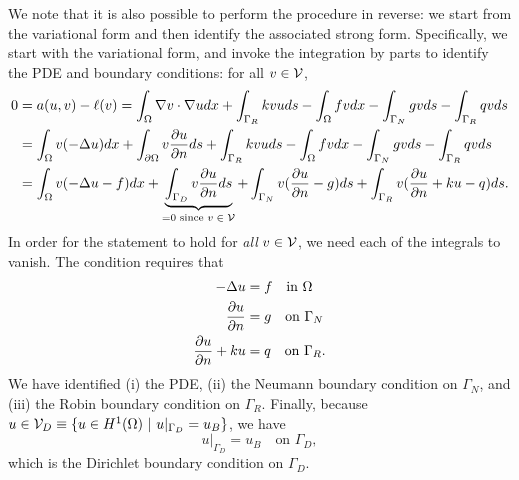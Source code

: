 We note that it is also possible to perform the procedure in reverse: we start from the variational form and then identify the associated strong form. Specifically, we start with the variational form, and invoke the integration by parts to identify the PDE and boundary conditions: for all $v \in \mathcal{V}$,
\begin{align*}
  0 &=
  a(u,v) - \ell(v)
  =
  \int_\Omega \nabla v \cdot \nabla u dx + \int_{\Gamma_R} k vu ds
  - \int_\Omega fv dx - \int_{\Gamma_N} gv ds - \int_{\Gamma_R} qv ds
  \\
  &= \int_\Omega v (-\Delta u) dx + \int_{\partial \Omega} v \frac{\partial u}{\partial n} ds
  + \int_{\Gamma_R} k vu ds
  - \int_\Omega fv dx - \int_{\Gamma_N} gv ds - \int_{\Gamma_R} qv ds
  \\
  &=
  \int_\Omega v(-\Delta u - f) dx
  + \underbrace{\int_{\Gamma_D} v \frac{\partial u}{\partial n} ds}_{=0 \text{ since $v \in \mathcal{V}$}}
  + \int_{\Gamma_N} v (\frac{\partial u}{\partial n} - g) ds
  + \int_{\Gamma_R} v (\frac{\partial u}{\partial n} + ku - q) ds.
\end{align*}
In order for the statement to hold for \emph{all} $v \in \mathcal{V}$, we need each of the integrals to vanish.  The condition requires that
\begin{align*}
  -\Delta u &= f \quad \text{in } \Omega \\
  \frac{\partial u}{\partial n} &= g \quad \text{on } \Gamma_N \\
  \frac{\partial u}{\partial n} + ku &= q \quad \text{on } \Gamma_R.
\end{align*}
We have identified (i) the PDE, (ii) the Neumann boundary condition on $\Gamma_N$, and (iii) the Robin boundary condition on $\Gamma_R$.  Finally, because $u \in \mathcal{V}_D \equiv \{ u \in H^1(\Omega) \ | \ u|_{\Gamma_D} = u_B \}$, we have
\begin{equation*}
  u|_{\Gamma_D} = u_B \quad \text{on } \Gamma_D,
\end{equation*}
which is the Dirichlet boundary condition on $\Gamma_D$.

